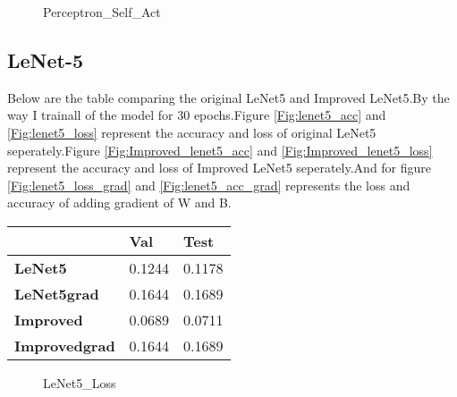 \documentclass[conference]{IEEEtran}
\begin{document}
        \begin{figure}[htb]
            \centering
            \renewcommand{\figurename}{Figure}
            \caption{Perceptron\_Self\_Act}
            \label{fig:perceptron_self_act}
        \end{figure}
        
    \subsection{LeNet-5}
    Below are the table comparing the original LeNet5 and Improved LeNet5.By the way I trainall of the model for 30 epochs.Figure \ref{Fig:lenet5_acc} and \ref{Fig:lenet5_loss} represent the accuracy and loss of original LeNet5 seperately.Figure \ref{Fig:Improved_lenet5_acc} and \ref{Fig:Improved_lenet5_loss} represent the accuracy and loss of Improved LeNet5 seperately.And for figure \ref{Fig:lenet5_loss_grad} and \ref{Fig:lenet5_acc_grad} represents the loss and accuracy of adding gradient of W and B.
        

    \begin{table}[htb]
    \begin{center}
        \begin{tabular}{l|l|l}
                          &   Val    &   Test     \\ \hline
        \textbf{LeNet5}   &   0.1244   &  0.1178 \\ 
        \textbf{LeNet5grad}   &   0.1644   &  0.1689 \\ 
        \textbf{Improved} &   0.0689 &  0.0711 \\ 
        \textbf{Improvedgrad} &   0.1644 &   0.1689 \\ 
    \end{tabular}
    \end{center}
    \end{table}

    \begin{figure}[htb]
        \centering
        \renewcommand{\figurename}{Figure}
            
        \caption{LeNet5\_Loss}
        \label{fig:loss}
    \end{figure}
\end{document}
